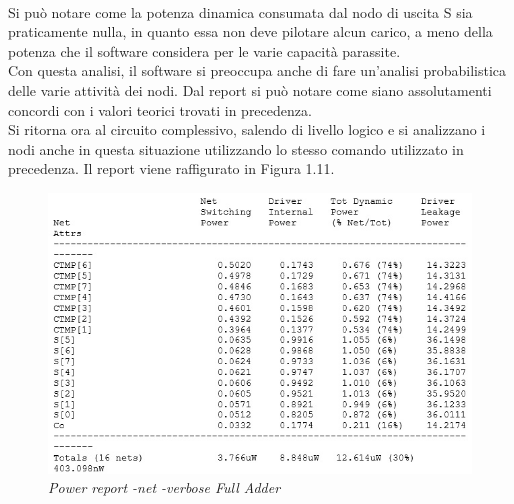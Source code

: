 \\
Si può notare come la potenza dinamica consumata dal nodo di uscita S sia praticamente nulla, in quanto essa non deve pilotare alcun carico, a meno della potenza che il software considera per le varie capacità parassite. \\
Con questa analisi, il software si preoccupa anche di fare un'analisi probabilistica delle varie attività dei nodi. Dal report si può notare come siano assolutamenti concordi con i valori teorici trovati in precedenza.\\
Si ritorna ora al circuito complessivo, salendo di livello logico e si analizzano i nodi anche in questa situazione utilizzando lo stesso comando utilizzato in precedenza. Il report viene raffigurato in Figura 1.11.
\begin{figure}[!htb]
	\centering
	\includegraphics[scale=0.6]{immagini/verbose_2}
	\caption{\textit{Power report -net -verbose Full Adder}}
	\label{verbose_2}
\end{figure}

